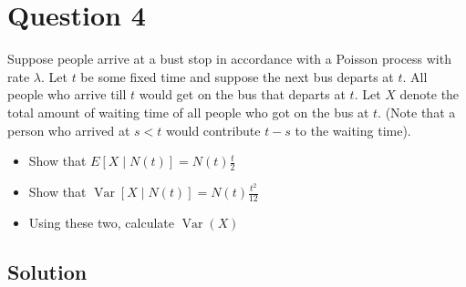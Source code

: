 \section*{Question 4}

Suppose people arrive at a bust stop in accordance with a Poisson process with rate \( \lambda \).
Let \( t \) be some fixed time and suppose the next bus departs at \( t \).
All people who arrive till \( t \) would get on the bus that departs at \( t \).
Let \( X \) denote the total amount of waiting time of all people who got on the bus at \( t \).
(Note that a person who arrived at \( s<t \) would contribute \( t-s \) to the waiting time).

\begin{itemize}
    \item Show that \( E[X \mid N(t)]=N(t) \frac{t}{2} \)
    \item Show that \( \operatorname{Var}[X \mid N(t)]=N(t) \frac{t^{2}}{12} \)
    \item Using these two, calculate \( \operatorname{Var}(X) \)
\end{itemize}

\subsection*{Solution}
